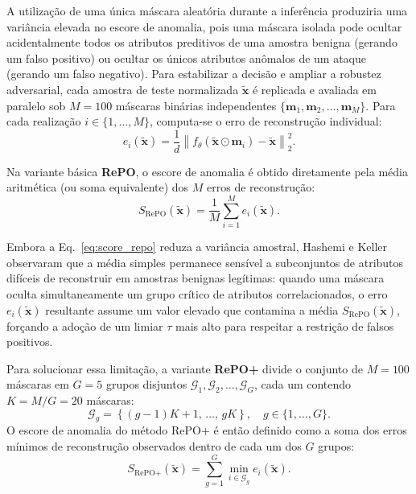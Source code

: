 \documentclass[conference]{IEEEtran}
\begin{document}
A utilização de uma única máscara aleatória durante a inferência produziria uma variância elevada no escore de anomalia, pois uma máscara isolada pode ocultar acidentalmente todos os atributos preditivos de uma amostra benigna (gerando um falso positivo) ou ocultar os únicos atributos anômalos de um ataque (gerando um falso negativo).
Para estabilizar a decisão e ampliar a robustez adversarial, cada amostra de teste normalizada $\tilde{\mathbf{x}}$ é replicada e avaliada em paralelo sob $M = 100$ máscaras binárias independentes $\{\mathbf{m}_1, \mathbf{m}_2, \dots, \mathbf{m}_M\}$.
Para cada realização $i \in \{1, \dots, M\}$, computa-se o erro de reconstrução individual:
\begin{equation}
e_i(\tilde{\mathbf{x}}) = \frac{1}{d} \left\| f_{\theta}\!\left(\tilde{\mathbf{x}} \odot \mathbf{m}_i\right) - \tilde{\mathbf{x}} \right\|_2^2.
\label{eq:erro_individual}
\end{equation}

Na variante básica \textbf{RePO}, o escore de anomalia é obtido diretamente pela média aritmética (ou soma equivalente) dos $M$ erros de reconstrução:
\begin{equation}
S_{\text{RePO}}(\tilde{\mathbf{x}}) = \frac{1}{M} \sum_{i=1}^{M} e_i(\tilde{\mathbf{x}}).
\label{eq:score_repo}
\end{equation}

Embora a Eq.~\eqref{eq:score_repo} reduza a variância amostral, Hashemi e Keller \cite{hashemi2020} observaram que a média simples permanece sensível a subconjuntos de atributos difíceis de reconstruir em amostras benignas legítimas: quando uma máscara oculta simultaneamente um grupo crítico de atributos correlacionados, o erro $e_i(\tilde{\mathbf{x}})$ resultante assume um valor elevado que contamina a média $S_{\text{RePO}}(\tilde{\mathbf{x}})$, forçando a adoção de um limiar $\tau$ mais alto para respeitar a restrição de falsos positivos.

Para solucionar essa limitação, a variante \textbf{RePO+} divide o conjunto de $M = 100$ máscaras em $G = 5$ grupos disjuntos $\mathcal{G}_1, \mathcal{G}_2, \dots, \mathcal{G}_G$, cada um contendo $K = M / G = 20$ máscaras:
\begin{equation}
\mathcal{G}_g = \left\{ (g-1)K + 1,\, \dots,\, gK \right\}, \quad g \in \{1, \dots, G\}.
\label{eq:grupos_repo_plus}
\end{equation}
O escore de anomalia do método RePO+ é então definido como a soma dos erros mínimos de reconstrução observados dentro de cada um dos $G$ grupos:
\begin{equation}
S_{\text{RePO+}}(\tilde{\mathbf{x}}) = \sum_{g=1}^{G} \min_{i \in \mathcal{G}_g} e_i(\tilde{\mathbf{x}}).
\label{eq:score_repo_plus}
\end{equation}
\end{document}
